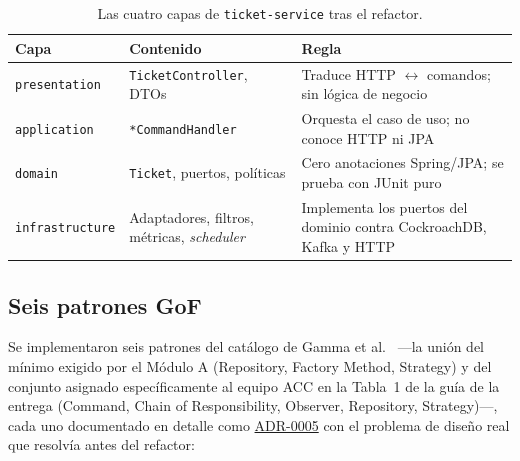 \begin{table}[H]
\centering
\small
\caption{Las cuatro capas de \texttt{ticket-service} tras el refactor.}
\label{tab:capas-e4}
\begin{tabular}{@{}p{2.6cm}p{5.8cm}p{5.1cm}@{}}
\toprule
\textbf{Capa} & \textbf{Contenido} & \textbf{Regla} \\
\midrule
\texttt{presentation} & \texttt{TicketController}, DTOs & Traduce HTTP $\leftrightarrow$ comandos; sin lógica de negocio \\
\texttt{application} & \texttt{*CommandHandler} & Orquesta el caso de uso; no conoce HTTP ni JPA \\
\texttt{domain} & \texttt{Ticket}, puertos, políticas & Cero anotaciones Spring/JPA; se prueba con JUnit puro \\
\texttt{infrastructure} & Adaptadores, filtros, métricas, \emph{scheduler} & Implementa los puertos del dominio contra CockroachDB, Kafka y HTTP \\
\bottomrule
\end{tabular}
\end{table}

\subsection{Seis patrones GoF}

Se implementaron seis patrones del catálogo de Gamma et al.~\cite{gamma1994patterns} —la unión
del mínimo exigido por el Módulo A (Repository, Factory Method, Strategy) y del conjunto
asignado específicamente al equipo ACC en la Tabla~1 de la guía de la entrega (Command, Chain of
Responsibility, Observer, Repository, Strategy)—, cada uno documentado en detalle como
\href{run:../adr/0005-patrones-gof.md}{ADR-0005} con el problema de diseño real que resolvía
antes del refactor:

